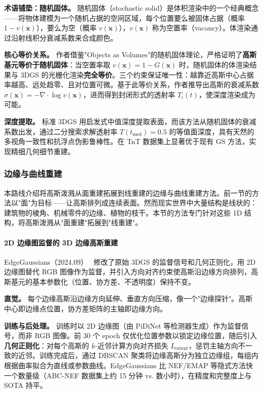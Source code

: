 \textbf{术语铺垫：随机固体。} 随机固体（stochastic solid）是体积渲染中的一个经典概念——将物体建模为一个随机占据的空间区域，每个位置要么被固体占据（概率 $1-v(\mathbf{x})$），要么为空（概率 $v(\mathbf{x})$），$v(\mathbf{x})$ 称为空置率（vacancy）。体渲染通过沿射线积分衰减系数来合成颜色。

\textbf{核心等价关系。} 作者借鉴"Objects as Volumes"的随机固体理论，严格证明了\textbf{高斯基元等价于随机固体}：当空置率取 $v(\mathbf{x}) = 1 - G(\mathbf{x})$ 时，随机固体的体渲染结果与 3DGS 的光栅化渲染\textbf{完全等价}。三个约束保证唯一性：越靠近高斯中心占据率越高、远处趋零、且对位置可微。基于此等价关系，作者推导出高斯的衰减系数 $\sigma(\mathbf{x}) = -\nabla \cdot \log v(\mathbf{x})$，进而得到封闭形式的透射率 $T_i(t)$，使深度渲染成为可能。

\textbf{深度提取。} 标准 3DGS 用启发式中值深度提取表面，而该方法从随机固体的衰减系数出发，通过二分搜索求解透射率 $T(t_{\mathrm{med}}) = 0.5$ 的等值面深度，具有天然的多视角一致性和抗浮点伪影鲁棒性。在 TnT 数据集上显著优于现有 GS 方法，实现精细几何细节重建。

\subsubsection{边缘与曲线重建}

本路线介绍将高斯泼溅从面重建拓展到线重建的边缘与曲线重建方法。前一节的方法以"面"为目标——让高斯排列成连续表面。然而现实世界中大量结构是线状的：建筑物的棱角、机械零件的边缘、植物的枝干。本节的方法专门针对这些 1D 结构，将高斯泼溅从"面重建"拓展到"线重建"。

\paragraph{2D 边缘图监督的 3D 边缘高斯重建}

EdgeGaussians（2024.09）~\cite{2409_12886} 修改了原始 3DGS 的监督信号和几何正则化，用 2D 边缘图替代 RGB 图像作为监督，并引入方向对齐约束使高斯沿边缘方向排列，高斯基元的基本参数化（位置、协方差、不透明度）保持不变。

\textbf{直觉。} 每个边缘高斯沿边缘方向延伸、垂直方向压缩，像一个"边缘探针"。高斯中心即边缘点位置，协方差矩阵的主轴即边缘方向。

\textbf{训练与后处理。} 训练时以 2D 边缘图（由 PiDiNet 等检测器生成）作为监督信号，而非 RGB 图像。前 30 个 epoch 仅优化位置参数以锁定边缘位置，随后引入\textbf{几何正则化}：对每个高斯的 $k$-近邻计算方向对齐损失 $L_{\mathrm{orient}}$，惩罚主轴方向不一致的近邻。训练完成后，通过 DBSCAN 聚类将边缘高斯分为独立边缘组，每组内根据曲率拟合为直线或参数曲线。EdgeGaussians 比 NEF/EMAP 等隐式方法快一个数量级（ABC-NEF 数据集上约 15 分钟 vs. 数小时），在精度和完整度上与 SOTA 持平。

